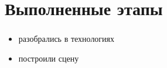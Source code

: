 \section{Выполненные этапы}

\begin{frame}
\frametitle{\insertsection} 
    \begin{itemize}
        \item разобрались в технологиях
        \item построили сцену
    \end{itemize}
\end{frame}
